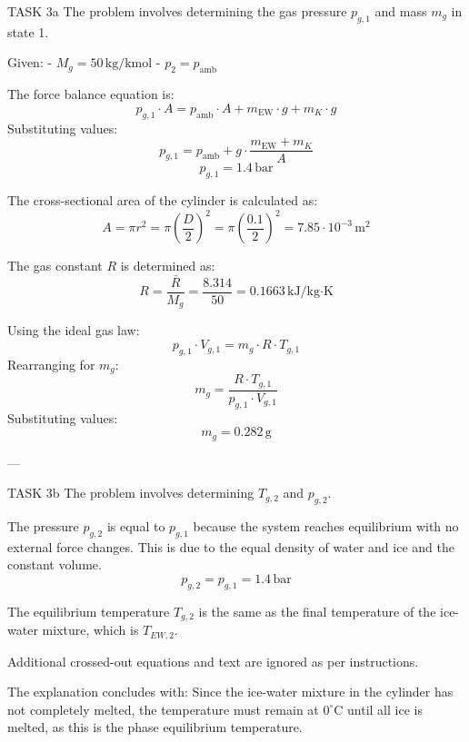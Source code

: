 TASK 3a  
The problem involves determining the gas pressure \( p_{g,1} \) and mass \( m_g \) in state 1.  

Given:  
- \( M_g = 50 \, \text{kg/kmol} \)  
- \( p_2 = p_{\text{amb}} \)  

The force balance equation is:  
\[
p_{g,1} \cdot A = p_{\text{amb}} \cdot A + m_{\text{EW}} \cdot g + m_K \cdot g
\]  
Substituting values:  
\[
p_{g,1} = p_{\text{amb}} + g \cdot \frac{m_{\text{EW}} + m_K}{A}
\]  
\[
p_{g,1} = 1.4 \, \text{bar}
\]  

The cross-sectional area of the cylinder is calculated as:  
\[
A = \pi r^2 = \pi \left(\frac{D}{2}\right)^2 = \pi \left(\frac{0.1}{2}\right)^2 = 7.85 \cdot 10^{-3} \, \text{m}^2
\]  

The gas constant \( R \) is determined as:  
\[
R = \frac{\bar{R}}{M_g} = \frac{8.314}{50} = 0.1663 \, \text{kJ/kg·K}
\]  

Using the ideal gas law:  
\[
p_{g,1} \cdot V_{g,1} = m_g \cdot R \cdot T_{g,1}
\]  
Rearranging for \( m_g \):  
\[
m_g = \frac{R \cdot T_{g,1}}{p_{g,1} \cdot V_{g,1}}
\]  
Substituting values:  
\[
m_g = 0.282 \, \text{g}
\]  

---

TASK 3b  
The problem involves determining \( T_{g,2} \) and \( p_{g,2} \).  

The pressure \( p_{g,2} \) is equal to \( p_{g,1} \) because the system reaches equilibrium with no external force changes. This is due to the equal density of water and ice and the constant volume.  
\[
p_{g,2} = p_{g,1} = 1.4 \, \text{bar}
\]  

The equilibrium temperature \( T_{g,2} \) is the same as the final temperature of the ice-water mixture, which is \( T_{EW,2} \).  

Additional crossed-out equations and text are ignored as per instructions.  

The explanation concludes with:  
Since the ice-water mixture in the cylinder has not completely melted, the temperature must remain at \( 0^\circ\text{C} \) until all ice is melted, as this is the phase equilibrium temperature.